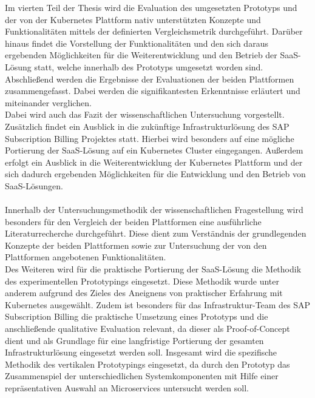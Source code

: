 Im vierten Teil der Thesis wird die Evaluation des umgesetzten Prototyps und der von der Kubernetes Plattform nativ unterstützten Konzepte und Funktionalitäten mittels der definierten Vergleichsmetrik durchgeführt. Darüber hinaus findet die Vorstellung der Funktionalitäten und den sich daraus ergebenden Möglichkeiten für die Weiterentwicklung und den Betrieb der \ac{SaaS}-Lösung statt, welche innerhalb des Prototyps umgesetzt worden sind.\\
Abschließend werden die Ergebnisse der Evaluationen der beiden Plattformen zusammengefasst. Dabei werden die signifikantesten Erkenntnisse erläutert und miteinander verglichen.\\
Dabei wird auch das Fazit der wissenschaftlichen Untersuchung vorgestellt. Zusätzlich findet ein Ausblick in die zukünftige Infrastrukturlösung des SAP Subscription Billing Projektes statt. Hierbei wird besonders auf eine mögliche Portierung der \ac{SaaS}-Lösung auf ein Kubernetes Cluster eingegangen. Außerdem erfolgt ein Ausblick in die Weiterentwicklung der Kubernetes Plattform und der sich dadurch ergebenden Möglichkeiten für die Entwicklung und den Betrieb von \ac{SaaS}-Lösungen.\\
\\
Innerhalb der Untersuchungsmethodik der wissenschaftlichen Fragestellung wird besonders für den Vergleich der beiden Plattformen eine ausführliche Literaturrecherche durchgeführt. Diese dient zum Verständnis der grundlegenden Konzepte der beiden Plattformen sowie zur Untersuchung der von den Plattformen angebotenen Funktionalitäten.\\
Des Weiteren wird für die praktische Portierung der \ac{SaaS}-Lösung die Methodik des experimentellen Prototypings eingesetzt. Diese Methodik wurde unter anderem aufgrund des Zieles des Aneignens von praktischer Erfahrung mit Kubernetes ausgewählt. Zudem ist besonders für das Infrastruktur-Team des SAP Subscription Billing die praktische Umsetzung eines Prototyps und die anschließende qualitative Evaluation relevant, da dieser als Proof-of-Concept dient und als Grundlage für eine langfristige Portierung der gesamten Infrastrukturlösung eingesetzt werden soll. Insgesamt wird die spezifische Methodik des vertikalen Prototypings eingesetzt, da durch den Prototyp das Zusammenspiel der unterschiedlichen Systemkomponenten mit Hilfe einer repräsentativen Auswahl an Microservices untersucht werden soll.\\



